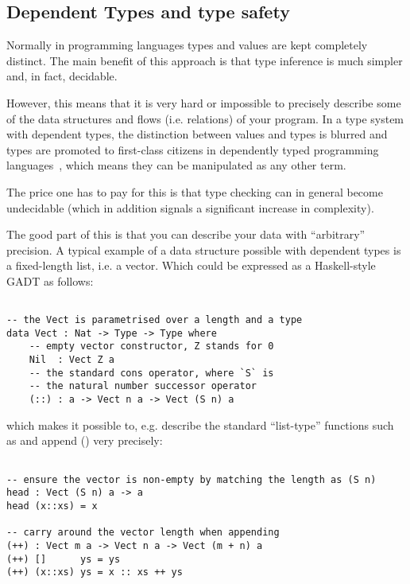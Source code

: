 \subsection{Dependent Types and type safety}

Normally in programming languages types and values are kept completely
distinct. The main benefit of this approach is that type inference is much
simpler and, in fact, decidable.

However, this means that it is very hard or impossible to precisely
describe some of the data structures and flows (i.e. relations) of your
program. In a type system with dependent types, the distinction between values
and types is blurred and types are promoted to first-class citizens in
dependently typed programming languages~\cite[p.~3]{idris-tutorial}, which
means they can be manipulated as any other term.

The price one has to pay for this is that type checking can in general become
undecidable (which in addition signals a significant increase in complexity).

The good part of this is that you can describe your data with ``arbitrary''
precision. A typical example of a data structure possible with dependent types
is a fixed-length list, i.e. a vector. Which could be expressed as
a Haskell-style GADT as follows:

\begin{BVerbatim}

-- the Vect is parametrised over a length and a type
data Vect : Nat -> Type -> Type where
    -- empty vector constructor, Z stands for 0
    Nil  : Vect Z a
    -- the standard cons operator, where `S` is
    -- the natural number successor operator
    (::) : a -> Vect n a -> Vect (S n) a

\end{BVerbatim}

which makes it possible to, e.g. describe the standard ``list-type'' functions
such as  and append (\code{++}) very precisely:

\begin{BVerbatim}

-- ensure the vector is non-empty by matching the length as (S n)
head : Vect (S n) a -> a
head (x::xs) = x

-- carry around the vector length when appending
(++) : Vect m a -> Vect n a -> Vect (m + n) a
(++) []      ys = ys
(++) (x::xs) ys = x :: xs ++ ys

\end{BVerbatim}

